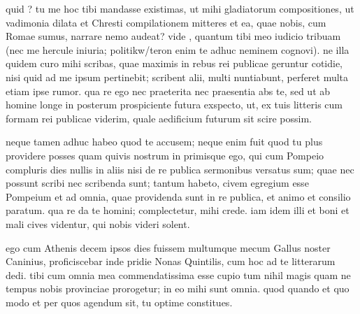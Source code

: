 


 quid ? tu me hoc tibi mandasse existimas, ut mihi gladiatorum compositiones, ut vadimonia dilata et Chresti compilationem mitteres et ea, quae nobis, cum Romae sumus, narrare nemo audeat? vide , quantum tibi meo iudicio tribuam (nec me hercule iniuria; politikw/teron enim te adhuc neminem cognovi). ne illa quidem curo mihi scribas, quae maximis in rebus rei publicae geruntur cotidie, nisi quid ad me ipsum pertinebit; scribent alii, multi nuntiabunt, perferet multa etiam ipse rumor. qua re ego nec praeterita nec praesentia abs te, sed ut ab homine longe in posterum prospiciente futura exspecto, ut, ex tuis litteris cum formam rei publicae viderim, quale aedificium futurum sit scire possim.

 neque tamen adhuc habeo quod te accusem; neque enim fuit quod tu plus providere posses quam quivis nostrum in primisque ego, qui cum Pompeio compluris dies nullis in aliis nisi de re publica sermonibus versatus sum; quae nec possunt scribi nec scribenda sunt; tantum habeto, civem egregium esse Pompeium et ad omnia, quae providenda sunt in re publica, et animo et consilio paratum. qua re da te homini; complectetur, mihi crede. iam idem illi et boni et mali cives videntur, qui nobis videri solent.

 ego cum Athenis decem ipsos dies fuissem multumque mecum Gallus noster Caninius, proficiscebar inde pridie Nonas Quintilis, cum hoc ad te litterarum dedi. tibi cum omnia mea commendatissima esse cupio tum nihil magis quam ne tempus nobis provinciae prorogetur; in eo mihi sunt omnia. quod quando et quo modo et per quos agendum sit, tu optime constitues.
